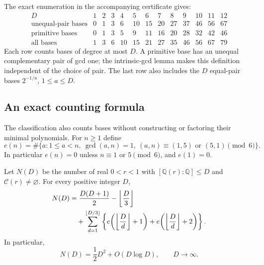 The exact enumeration in the accompanying certificate gives:
\[
\begin{array}{c|rrrrrrrrrrrr}
D&1&2&3&4&5&6&7&8&9&10&11&12\\\hline
\text{unequal-pair bases}&0&1&3&6&10&15&20&27&37&46&56&67\\
\text{primitive bases}&0&1&3&5&9&11&16&20&28&32&42&46\\
\text{all bases}&1&3&6&10&15&21&27&35&46&56&67&79
\end{array}
\]
Each row counts bases of degree at most $D$.  A primitive base has
an unequal complementary pair of gcd one; the intrinsic-gcd lemma
makes this definition independent of the choice of pair.
The last row also includes the $D$ equal-pair bases $2^{-1/a}$,
$1\le a\le D$.

\subsection{An exact counting formula}

The classification also counts bases without constructing or factoring
their minimal polynomials.  For $n\ge1$ define
\[
e(n)=\#\{a:1\le a<n,\ \gcd(a,n)=1,
            \ (a,n)\equiv(1,5)\text{ or }(5,1)\pmod6\}.
\]
In particular $e(n)=0$ unless $n\equiv1$ or $5\pmod6$,
and $e(1)=0$.

\begin{corollary}
\label{rigid:cor:base-count}
Let $N(D)$ be the number of real $0<r<1$ with
$[\mathbb Q(r):\mathbb Q]\le D$ and $\mathcal C(r)\ne\varnothing$.
For every positive integer $D$,
\begin{align}
N(D)&=\frac{D(D+1)}2-\left\lfloor\frac D3\right\rfloor\notag\\
&\quad+\sum_{d=1}^{\lfloor D/3\rfloor}
\left\{e\!\left(\left\lfloor\frac Dd\right\rfloor+1\right)
       +e\!\left(\left\lfloor\frac Dd\right\rfloor+2\right)\right\}.
\label{rigid:eq:exact-base-count}
\end{align}
In particular,
\[
N(D)=\frac12D^2+O(D\log D),\qquad D\longrightarrow\infty.
\]
\end{corollary}

